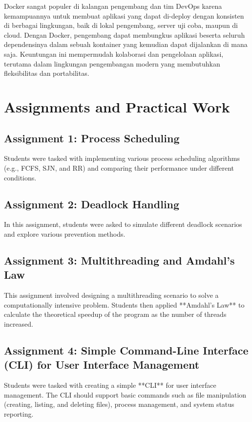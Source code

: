 \documentclass[12pt]{article}
\begin{document}
\begin{enumerate}
    Docker sangat populer di kalangan pengembang dan tim DevOps karena kemampuannya untuk membuat aplikasi yang dapat di-deploy dengan konsisten di berbagai lingkungan, baik di lokal pengembang, server uji coba, maupun di cloud. Dengan Docker, pengembang dapat membungkus aplikasi beserta seluruh dependensinya dalam sebuah kontainer yang kemudian dapat dijalankan di mana saja. Keuntungan ini mempermudah kolaborasi dan pengelolaan aplikasi, terutama dalam lingkungan pengembangan modern yang membutuhkan fleksibilitas dan portabilitas.
\end{enumerate}

\section{Assignments and Practical Work}
\subsection{Assignment 1: Process Scheduling}
Students were tasked with implementing various process scheduling algorithms (e.g., FCFS, SJN, and RR) and comparing their performance under different conditions.

\subsection{Assignment 2: Deadlock Handling}
In this assignment, students were asked to simulate different deadlock scenarios and explore various prevention methods.

\subsection{Assignment 3: Multithreading and Amdahl's Law}
This assignment involved designing a multithreading scenario to solve a computationally intensive problem. Students then applied **Amdahl's Law** to calculate the theoretical speedup of the program as the number of threads increased.

\subsection{Assignment 4: Simple Command-Line Interface (CLI) for User Interface Management}
Students were tasked with creating a simple **CLI** for user interface management. The CLI should support basic commands such as file manipulation (creating, listing, and deleting files), process management, and system status reporting.
\end{document}
